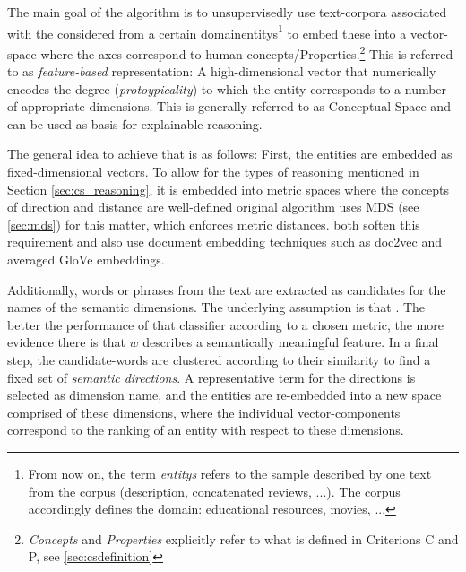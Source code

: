 
The main goal of the algorithm is to unsupervisedly use text-corpora associated with the considered from a certain domain\glspl{entity}\footnote{From now on, the term \textit{\glspl{entity}} refers to the sample described by one text from the corpus (description, concatenated reviews, ...). The corpus accordingly defines the domain: educational resources, movies, ...} to embed these into a vector-space where the axes correspond to human concepts/Properties.\footnote{\textit{Concepts} and \textit{Properties} explicitly refer to what is defined in Criterions C and P, see \ref{sec:csdefinition}} This is referred to as \textit{feature-based} representation: A high-dimensional vector that numerically encodes the degree (\textit{protoypicality}) to which the entity corresponds to a number of appropriate dimensions. This is generally referred to as Conceptual Space and can be used as basis for explainable reasoning.

The general idea to achieve that is as follows: First, the entities are embedded as fixed-dimensional vectors. To allow for the types of reasoning mentioned in Section \ref{sec:cs_reasoning}, it is embedded into metric spaces where the concepts of direction and distance are well-defined  original algorithm uses MDS (see \ref{sec:mds}) for this matter, which enforces metric distances. \cite{Ager2018,Alshaikh2020} both soften this requirement and also use document embedding techniques such as doc2vec and averaged GloVe  embeddings.

Additionally, words or phrases from the text are extracted as candidates for the names of the semantic dimensions. The underlying assumption is that  \cite[3574]{Alshaikh2020}. The better the performance of that classifier according to a chosen metric, the more evidence there is that $w$ describes a semantically meaningful feature. 
In a final step, the candidate-words are clustered according to their similarity to find a fixed set of \emph{semantic directions}. A representative term for the directions is selected as dimension name, and the entities are re-embedded into a new space comprised of these dimensions, where the individual vector-components correspond to the ranking of an entity with respect to these dimensions.

